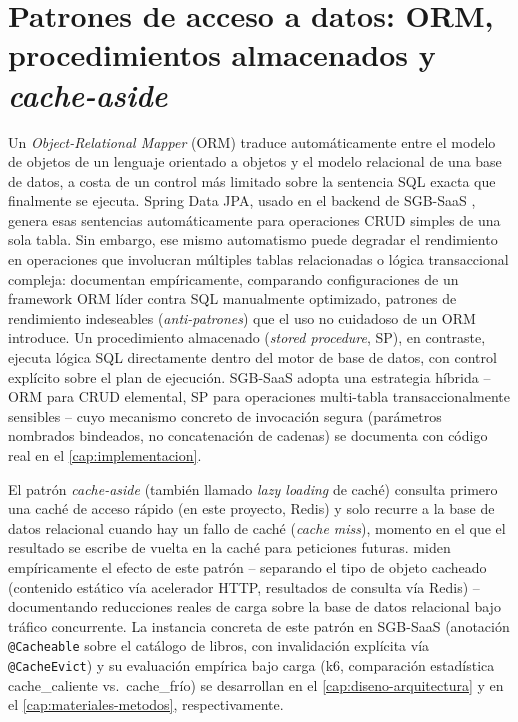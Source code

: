 \section{Patrones de acceso a datos: ORM, procedimientos almacenados y \emph{cache-aside}}
\label{sec:mt-acceso-datos}

Un \emph{Object-Relational Mapper} (ORM) traduce automáticamente entre el
modelo de objetos de un lenguaje orientado a objetos y el modelo
relacional de una base de datos, a costa de un control más limitado sobre
la sentencia SQL exacta que finalmente se ejecuta. Spring Data JPA,
usado en el backend de SGB-SaaS \citep{walls2022springinaction}, genera
esas sentencias automáticamente para operaciones CRUD simples de una sola
tabla. Sin embargo, ese mismo automatismo puede degradar el rendimiento
en operaciones que involucran múltiples tablas relacionadas o lógica
transaccional compleja: \citet{colley2018ormperformance} documentan
empíricamente, comparando configuraciones de un framework ORM líder
contra SQL manualmente optimizado, patrones de rendimiento indeseables
(\emph{anti-patrones}) que el uso no cuidadoso de un ORM introduce. Un
procedimiento almacenado (\emph{stored procedure}, SP), en contraste,
ejecuta lógica SQL directamente dentro del motor de base de datos, con
control explícito sobre el plan de ejecución. SGB-SaaS adopta una
estrategia híbrida -- ORM para CRUD elemental, SP para operaciones
multi-tabla transaccionalmente sensibles -- cuyo mecanismo concreto de
invocación segura (parámetros nombrados bindeados, no concatenación de
cadenas) se documenta con código real en el \autoref{cap:implementacion}.

El patrón \emph{cache-aside} (también llamado \emph{lazy loading} de
caché) consulta primero una caché de acceso rápido (en este proyecto,
Redis) y solo recurre a la base de datos relacional cuando hay un fallo
de caché (\emph{cache miss}), momento en el que el resultado se escribe
de vuelta en la caché para peticiones futuras. \citet{kusuma2017rediscaching}
miden empíricamente el efecto de este patrón -- separando el tipo de
objeto cacheado (contenido estático vía acelerador HTTP, resultados de
consulta vía Redis) -- documentando reducciones reales de carga sobre la
base de datos relacional bajo tráfico concurrente. La instancia concreta
de este patrón en SGB-SaaS (anotación \texttt{@Cacheable} sobre el
catálogo de libros, con invalidación explícita vía \texttt{@CacheEvict})
y su evaluación empírica bajo carga (k6, comparación estadística
cache\_caliente vs.\ cache\_frío) se desarrollan en el
\autoref{cap:diseno-arquitectura} y en el \autoref{cap:materiales-metodos},
respectivamente.
